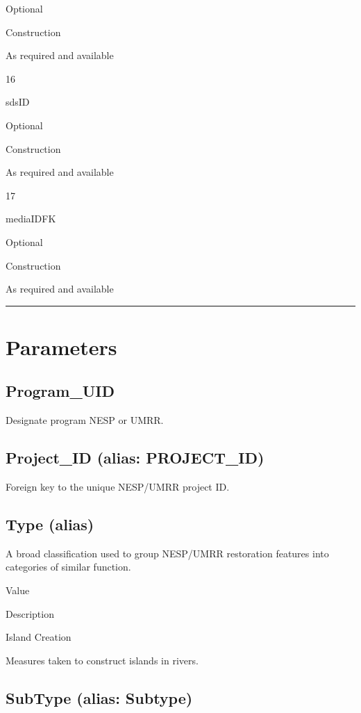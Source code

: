 \documentclass[
  letterpaper,
  DIV=11,
  numbers=noendperiod]{scrreprt}
\begin{document}
Optional

Construction

As required and available

16

sdsID

Optional

Construction

As required and available

17

mediaIDFK

Optional

Construction

As required and available

\begin{center}\rule{0.5\linewidth}{0.5pt}\end{center}

\section{Parameters}\label{parameters-7}

\subsection{Program\_UID}\label{program_uid-7}

Designate program NESP or UMRR.

\subsection{Project\_ID (alias:
PROJECT\_ID)}\label{project_id-alias-project_id-7}

Foreign key to the unique NESP/UMRR project ID.

\subsection{Type (alias)}\label{type-alias-6}

A broad classification used to group NESP/UMRR restoration features into
categories of similar function.

Value

Description

Island Creation

Measures taken to construct islands in rivers.

\subsection{SubType (alias: Subtype)}\label{subtype-alias-subtype-7}
\end{document}

